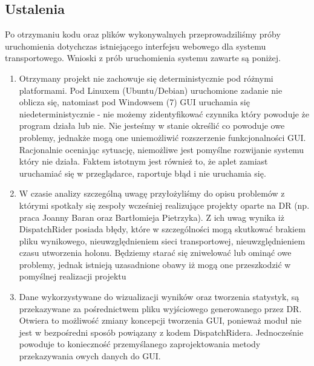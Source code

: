 \subsection{Ustalenia}
Po otrzymaniu kodu oraz plików wykonywalnych przeprowadziliśmy próby uruchomienia dotychczas istniejącego interfejsu webowego dla systemu transportowego. Wnioski z prób uruchomienia systemu zawarte są poniżej.
\\  
\begin{enumerate}
\item Otrzymany projekt nie zachowuje się deterministycznie pod różnymi platformami. Pod Linuxem (Ubuntu/Debian) uruchomione zadanie nie oblicza się, natomiast pod Windowsem (7) GUI uruchamia się niedeterministycznie - nie możemy zidentyfikować czynnika który powoduje że program działa lub nie. Nie jesteśmy w stanie określić co powoduje owe problemy, jednakże mogą one uniemożliwić rozszerzenie funkcjonalności GUI. Racjonalnie oceniając sytuację, niemożliwe jest pomyślne rozwijanie systemu który nie działa. Faktem istotnym jest również to, że aplet zamiast uruchamiać się w przeglądarce, raportuje błąd i nie uruchamia się.
\item W czasie analizy szczególną uwagę przyłożyliśmy do opisu problemów z którymi spotkały się zespoły wcześniej realizujące projekty oparte na DR (np. praca Joanny Baran oraz Bartłomieja Pietrzyka). Z ich uwag wynika iż DispatchRider posiada błędy, które w szczególności mogą skutkować brakiem pliku wynikowego, nieuwzględnieniem sieci transportowej, nieuwzględnieniem czasu utworzenia holonu. Będziemy starać się zniwelować lub ominąć owe problemy, jednak istnieją uzasadnione obawy iż mogą one przeszkodzić w pomyślnej realizacji projektu 
\item Dane wykorzystywane do wizualizacji wyników oraz tworzenia statystyk, są przekazywane za pośrednictwem pliku wyjściowego generowanego przez DR. Otwiera to możliwość zmiany koncepcji tworzenia GUI, ponieważ moduł nie jest w bezpośredni sposób powiązany z kodem DispatchRidera. Jednocześnie powoduje to konieczność przemyślanego zaprojektowania metody przekazywania owych danych do GUI.
\end{enumerate}

